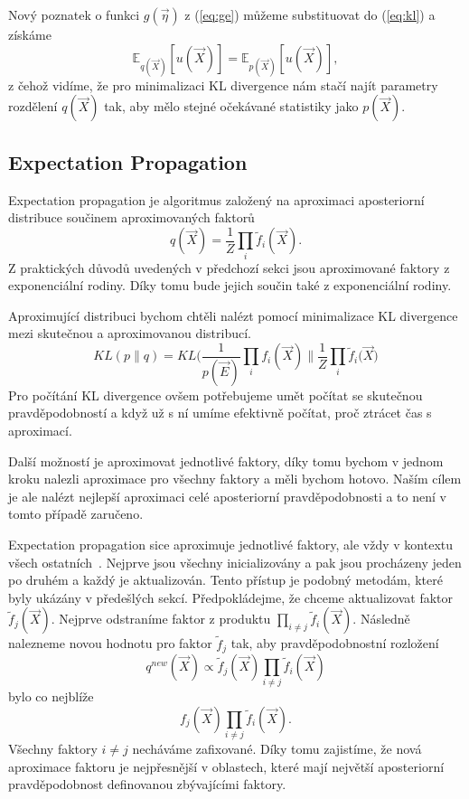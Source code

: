 Nový poznatek o funkci $g(\vec\eta)$ z (\ref{eq:ge}) můžeme substituovat do (\ref{eq:kl}) a získáme
\begin{equation}
\mathbb{E}_{q(\vec{X})}[u(\vec{X})] = \mathbb{E}_{p(\vec{X})}[u(\vec{X})],
\label{eq:ee}
\end{equation}
z čehož vidíme, že pro minimalizaci KL divergence nám stačí najít parametry rozdělení $q(\vec{X})$ tak, aby mělo stejné očekávané statistiky jako $p(\vec{X})$.

\subsection{Expectation Propagation}
\label{sec:ep}

Expectation propagation je algoritmus založený na aproximaci aposteriorní distribuce součinem aproximovaných faktorů
\begin{equation}
q(\vec{X}) = \frac{1}{Z} \prod_i \tilde{f}_i(\vec{X}).
\end{equation}
Z praktických důvodů uvedených v předchozí sekci jsou aproximované faktory z exponenciální rodiny.
Díky tomu bude jejich součin také z exponenciální rodiny.

Aproximující distribuci bychom chtěli nalézt pomocí minimalizace KL divergence mezi skutečnou a aproximovanou distribucí.
\begin{equation}
KL(p \| q) = KL\bigg(\frac{1}{p(\vec{E})} \prod_i f_i(\vec{X}) \bigg\| \frac{1}{Z} \prod_i \tilde{f}_i(\vec{X} \bigg)
\end{equation}
Pro počítání KL divergence ovšem potřebujeme umět počítat se skutečnou pravděpodobností a když už s ní umíme efektivně počítat, proč ztrácet čas s aproximací.

Další možností je aproximovat jednotlivé faktory, díky tomu bychom v jednom kroku nalezli aproximace pro všechny faktory a měli bychom hotovo.
Naším cílem je ale nalézt nejlepší aproximaci celé aposteriorní pravděpodobnosti a to není v tomto případě zaručeno.

Expectation propagation sice aproximuje jednotlivé faktory, ale vždy v kontextu všech ostatních~\cite{bishop2006pattern}.
Nejprve jsou všechny inicializovány a pak jsou procházeny jeden po druhém a každý je aktualizován.
Tento přístup je podobný metodám, které byly ukázány v předešlých sekcí.
Předpokládejme, že chceme aktualizovat faktor $\tilde{f}_j (\vec{X})$.
Nejprve odstraníme faktor z produktu $\prod_{i \ne j} \tilde{f}_i(\vec{X})$.
Následně nalezneme novou hodnotu pro faktor $\tilde{f}_j$ tak, aby pravděpodobnostní rozložení
\begin{equation}
q^{new}(\vec{X}) \propto \tilde{f}_j(\vec{X}) \prod_{i \ne j} \tilde{f}_i(\vec{X})
\label{eq:qnew}
\end{equation}
bylo co nejblíže 
\begin{equation}
f_j(\vec{X})\prod_{i \ne j} \tilde{f}_i(\vec{X}).
\end{equation}
Všechny faktory $i \ne j$ necháváme zafixované. 
Díky tomu zajistíme, že nová aproximace faktoru je nejpřesnější v oblastech, které mají největší aposteriorní pravděpodobnost definovanou zbývajícími faktory.

